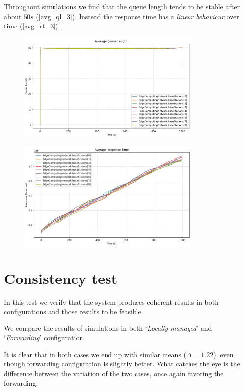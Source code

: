 \documentclass{report}
\begin{document}
Throughout simulations we find that the queue length tends to be stable after about $50s$ (\autoref{avg_ql_3}). Instead the response time has a \textit{linear behaviour} over time (\autoref{avg_rt_3}).

\begin{figure}[H]
    \centering
    \includegraphics[width=0.8\textwidth]{img/avg_ql_3.png}
    \caption{}
    \label{avg_ql_3}
\end{figure}
\begin{figure}[H]
    \centering
    \includegraphics[width=0.8\textwidth]{img/avg_rt_3.png}
    \caption{}
    \label{avg_rt_3}
\end{figure}

\section{Consistency test}
In this test we verify that the system produces coherent results in both configurations and those results to be feasible.

We compare the results of simulations in both `\textit{Locally managed}' and `\textit{Forwarding}' configuration.

It is clear that in both cases we end up with similar means ($\Delta=1.22$), even though forwarding configuration is slightly better. What catches the eye is the difference between the variation of the two cases, once again favoring the forwarding.
\end{document}
